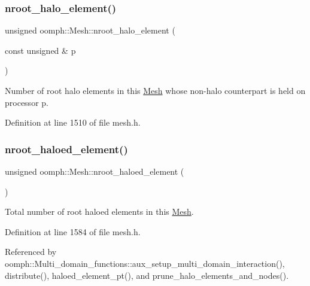 \subsubsection{\texorpdfstring{nroot\+\_\+halo\+\_\+element()}{nroot\_halo\_element()}\hspace{0.1cm}{\footnotesize\ttfamily [2/2]}}
{\footnotesize\ttfamily unsigned oomph\+::\+Mesh\+::nroot\+\_\+halo\+\_\+element (\begin{DoxyParamCaption}\item[{const unsigned \&}]{p }\end{DoxyParamCaption})\hspace{0.3cm}{\ttfamily [inline]}}



Number of root halo elements in this \hyperlink{classoomph_1_1Mesh}{Mesh} whose non-\/halo counterpart is held on processor p. 



Definition at line 1510 of file mesh.\+h.

\mbox{\label{classoomph_1_1Mesh_a9892d5aa82024c973b021cf6c49356a9}} 
\subsubsection{\texorpdfstring{nroot\+\_\+haloed\+\_\+element()}{nroot\_haloed\_element()}\hspace{0.1cm}{\footnotesize\ttfamily [1/2]}}
{\footnotesize\ttfamily unsigned oomph\+::\+Mesh\+::nroot\+\_\+haloed\+\_\+element (\begin{DoxyParamCaption}{ }\end{DoxyParamCaption})\hspace{0.3cm}{\ttfamily [inline]}}



Total number of root haloed elements in this \hyperlink{classoomph_1_1Mesh}{Mesh}. 



Definition at line 1584 of file mesh.\+h.



Referenced by oomph\+::\+Multi\+\_\+domain\+\_\+functions\+::aux\+\_\+setup\+\_\+multi\+\_\+domain\+\_\+interaction(), distribute(), haloed\+\_\+element\+\_\+pt(), and prune\+\_\+halo\+\_\+elements\+\_\+and\+\_\+nodes().

